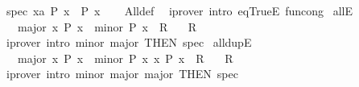\begin{isabellebody}
{}
\isamarkuptrue%
%
\endisatagdocument
{\isafolddocument}%
%
\isadelimdocument
%
\endisadelimdocument
{}\isamarkupfalse%
\ spec{\isacharcolon}{\kern0pt}\ {\isachardoublequoteopen}{\isasymforall}x{\isacharcolon}{\kern0pt}{\isacharcolon}{\kern0pt}{\isacharprime}{\kern0pt}a{\isachardot}{\kern0pt}\ P\ x\ {\isasymLongrightarrow}\ P\ x{\isachardoublequoteclose}\isanewline
%
\isadelimproof
\ \ %
\endisadelimproof
%
\isatagproof
{}\isamarkupfalse%
\ All{\isacharunderscore}{\kern0pt}def\ \isamarkupfalse%
\ {\isacharparenleft}{\kern0pt}iprover\ intro{\isacharcolon}{\kern0pt}\ eqTrueE\ fun{\isacharunderscore}{\kern0pt}cong{\isacharparenright}{\kern0pt}%
\endisatagproof
{\isafoldproof}%
%
\isadelimproof
\isanewline
%
\endisadelimproof
\isanewline
{}\isamarkupfalse%
\ allE{\isacharcolon}{\kern0pt}\isanewline
\ \ \ major{\isacharcolon}{\kern0pt}\ {\isachardoublequoteopen}{\isasymforall}x{\isachardot}{\kern0pt}\ P\ x{\isachardoublequoteclose}\ \ minor{\isacharcolon}{\kern0pt}\ {\isachardoublequoteopen}P\ x\ {\isasymLongrightarrow}\ R{\isachardoublequoteclose}\isanewline
\ \ \ R\isanewline
%
\isadelimproof
\ \ %
\endisadelimproof
%
\isatagproof
{}\isamarkupfalse%
\ {\isacharparenleft}{\kern0pt}iprover\ intro{\isacharcolon}{\kern0pt}\ minor\ major\ {\isacharbrackleft}{\kern0pt}THEN\ spec{\isacharbrackright}{\kern0pt}{\isacharparenright}{\kern0pt}%
\endisatagproof
{\isafoldproof}%
%
\isadelimproof
\isanewline
%
\endisadelimproof
\isanewline
{}\isamarkupfalse%
\ all{\isacharunderscore}{\kern0pt}dupE{\isacharcolon}{\kern0pt}\isanewline
\ \ \ major{\isacharcolon}{\kern0pt}\ {\isachardoublequoteopen}{\isasymforall}x{\isachardot}{\kern0pt}\ P\ x{\isachardoublequoteclose}\ \ minor{\isacharcolon}{\kern0pt}\ {\isachardoublequoteopen}{\isasymlbrakk}P\ x{\isacharsemicolon}{\kern0pt}\ {\isasymforall}x{\isachardot}{\kern0pt}\ P\ x{\isasymrbrakk}\ {\isasymLongrightarrow}\ R{\isachardoublequoteclose}\isanewline
\ \ \ R\isanewline
%
\isadelimproof
\ \ %
\endisadelimproof
%
\isatagproof
{}\isamarkupfalse%
\ {\isacharparenleft}{\kern0pt}iprover\ intro{\isacharcolon}{\kern0pt}\ minor\ major\ major\ {\isacharbrackleft}{\kern0pt}THEN\ spec{\isacharbrackright}{\kern0pt}{\isacharparenright}{\kern0pt}%
\endisatagproof
{\isafoldproof}%
%
\isadelimproof
%
\endisadelimproof
%
\isadelimdocument
%
\endisadelimdocument
%
\isatagdocument
%
\isamarkuptrue%

\end{isabellebody}

